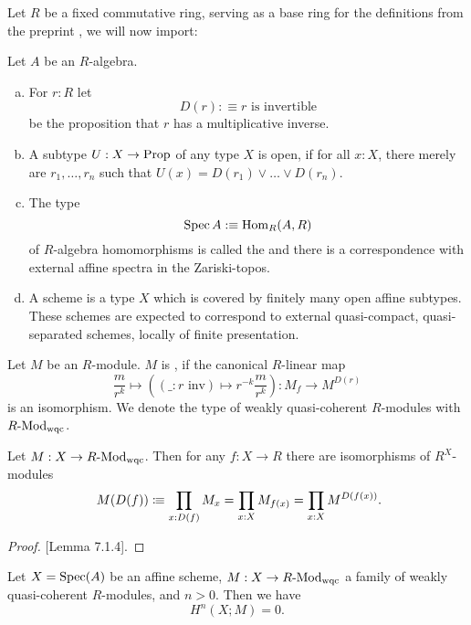 
Let $R$ be a fixed commutative ring,
serving as a base ring for the definitions from the preprint \cite{draft},
we will now import:

\begin{definition}
  Let $A$ be an $R$-algebra.
  \begin{enumerate}[(a)]
  \item For $r:R$ let
    \[
      D(r):\equiv \text{$r$ is invertible}
    \]
    be the proposition that $r$ has a multiplicative inverse.
  \item A subtype $U:X\to \mathrm{Prop}$ of any type $X$ is open,
    if for all $x:X$, there merely are $r_1,\dots,r_n$ such that $U(x)=D(r_1)\vee \dots \vee D(r_n)$.
  \item The type
    \[
      \operatorname{Spec} A :\equiv \mathrm{Hom}_{R}(A,R)
    \]
    of $R$-algebra homomorphisms is called the 
    and there is a correspondence with external affine spectra in the Zariski-topos.
  \item A scheme is a type $X$ which is covered by finitely many open affine subtypes.
    These schemes are expected to correspond to
    external quasi-compact, quasi-separated schemes, locally of finite presentation.
  \end{enumerate}
\end{definition}

\begin{definition}
  Let $M$ be an $R$-module.
  $M$ is , if the canonical $R$-linear map
  \[
    \frac{m}{r^k}\mapsto ((\_: r\text{ inv})\mapsto r^{-k}\frac{m}{r^k}):M_f\to M^{D(r)}
  \]
  is an isomorphism.
  We denote the type of weakly quasi-coherent $R$-modules with $R\text{-}\mathrm{Mod}_{\text{wqc}}$.
\end{definition}

\begin{remark}
  Let $M:X\to R\text{-}\mathrm{Mod}_{\mathrm{wqc}}$.
  Then for any $f:X\to R$ there are isomorphisms of $R^X$-modules
  \[
  M(D(f))\colonequiv \prod_{x:D(f)}M_x  = \prod_{x:X}M_{f(x)} = \prod_{x:X}M^{D(f(x))}
  \rlap{.}
  \]
\end{remark}

\begin{proof}
  \cite{draft}[Lemma 7.1.4].
\end{proof}

\begin{theorem}
  \label{affine-vanishing}
Let $X = \operatorname{Spec}(A)$ be an affine scheme, 
$M : X \to R\text{-}\mathrm{Mod}_{\text{wqc}}$ a family of weakly quasi-coherent $R$-modules,
and $n > 0$.
Then we have
	\[
		H^n(X;M) = 0.
		\]
\end{theorem}

